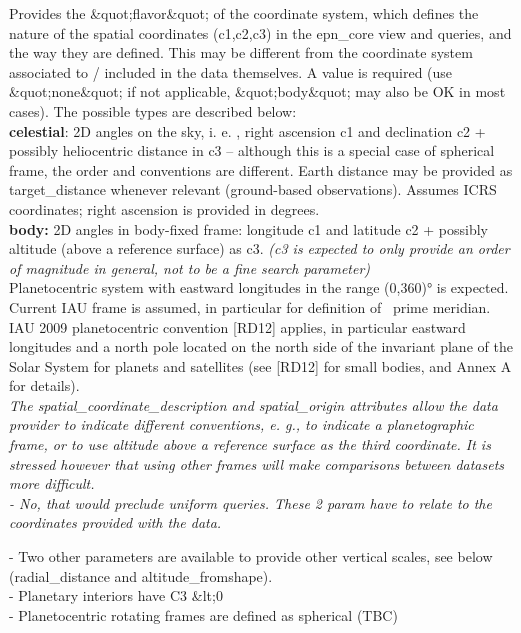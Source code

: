 \documentclass[11pt,a4paper]{ivoa}
\begin{document}
Provides the \&quot;flavor\&quot; of the coordinate system, which defines the nature of the spatial coordinates (c1,c2,c3) in the epn\_core view and queries, and the way they are defined. This may be different from the coordinate system associated to / included in the data themselves. A value is required (use \&quot;none\&quot; if not applicable, \&quot;body\&quot; may also be OK in most cases). The possible types are described below: \\ \textbf{celestial}: 2D angles on the sky, i. e. , right ascension c1 and declination c2 + possibly heliocentric distance in c3 – although this is a special case of spherical frame, the order and conventions are different. Earth distance may be provided as target\_distance whenever relevant (ground-based observations). Assumes ICRS coordinates; right ascension is provided in degrees.\\ \textbf{body:} 2D angles in body-fixed frame: longitude c1 and latitude c2 + possibly altitude (above a reference surface) as c3. \emph{(c3 is expected to only provide an order of magnitude in general, not to be a fine search parameter)}\\Planetocentric system with eastward longitudes in the range (0,360)° is expected. Current IAU frame is assumed, in particular for definition of  prime meridian.\\IAU 2009 planetocentric convention [RD12] applies, in particular eastward longitudes and a north pole located on the north side of the invariant plane of the Solar System for planets and satellites (see [RD12] for small bodies, and Annex A for details). \emph{ }\\\emph{ The spatial\_coordinate\_description and spatial\_origin attributes allow the data provider to indicate different conventions, e. g., to indicate a planetographic frame, or to use altitude above a reference surface as the third coordinate. It is stressed however that using other frames will make comparisons between datasets more difficult.\\- No, that would preclude uniform queries. These 2 param have to relate to the coordinates provided with the data.\\}

- Two other parameters are available to provide other vertical scales, see below (radial\_distance and altitude\_fromshape). \\- Planetary interiors have C3 \&lt;0 \\- Planetocentric rotating frames are defined as spherical (TBC)\\
\end{document}

